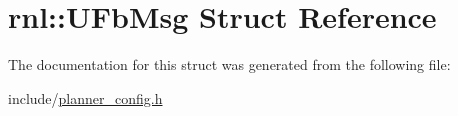 \hypertarget{structrnl_1_1UFbMsg}{}\section{rnl\+:\+:U\+Fb\+Msg Struct Reference}
\label{structrnl_1_1UFbMsg}


The documentation for this struct was generated from the following file\+:\begin{DoxyCompactItemize}
\item 
include/\hyperlink{planner__config_8h}{planner\+\_\+config.\+h}\end{DoxyCompactItemize}
